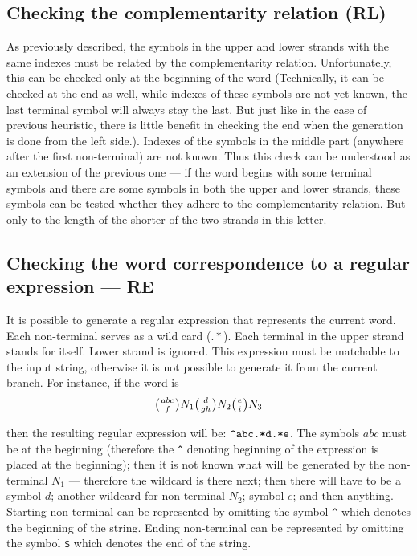 \subsection{Checking the complementarity relation (RL)}
As previously described, the symbols in the upper and lower strands with the same indexes must be related by the complementarity relation. Unfortunately, this can be checked only at the beginning of the word (Technically, it can be checked at the end as well, while indexes of these symbols are not yet known, the last terminal symbol will always stay the last. But just like in the case of previous heuristic, there is little benefit in checking the end when the generation is done from the left side.). Indexes of the symbols in the middle part (anywhere after the first non-terminal) are not known. Thus this check can be understood as an extension of the previous one --- if the word begins with some terminal symbols and there are some symbols in both the upper and lower strands, these symbols can be tested whether they adhere to the complementarity relation. But only to the length of the shorter of the two strands in this letter.

\subsection{Checking the word correspondence to a regular expression --- RE}
It is possible to generate a regular expression that represents the current word. Each non-terminal serves as a wild card ($.*$). Each terminal in the upper strand stands for itself. Lower strand is ignored. This expression must be matchable to the input string, otherwise it is not possible to generate it from the current branch. For instance, if the word is
$$\wkpair{abc}{f}N_1\wkpair{d}{gh}N_2\wkpair{e}{i}N_3$$

then the resulting regular expression will be: $\verb/^abc.*d.*e/$. The symbols $abc$ must be at the beginning (therefore the \verb/^/ denoting beginning of the expression is placed at the beginning); then it is not known what will be generated by the non-terminal $N_1$ --- therefore the wildcard is there next; then there will have to be a symbol $d$; another wildcard for non-terminal $N_2$; symbol $e$; and then anything. Starting non-terminal can be represented by omitting the symbol \verb/^/ which denotes the beginning of the string. Ending non-terminal can be represented by omitting the symbol \verb/$/ which denotes the end of the string.

\medskip

